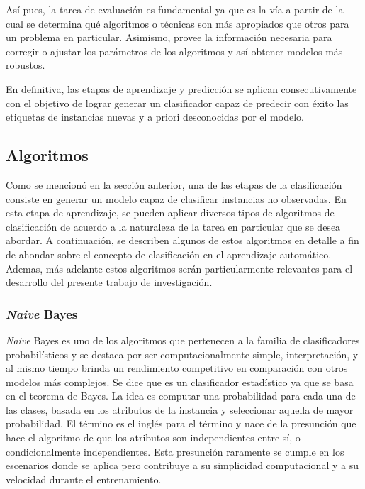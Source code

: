 Así pues, la tarea de evaluación es fundamental ya que es la vía a partir de la
cual se determina qué algoritmos o técnicas son más apropiados que otros para un
problema en particular. Asimismo, provee la información necesaria para corregir
o ajustar los parámetros de los algoritmos y así obtener modelos más robustos. 

En definitiva, las etapas de aprendizaje y predicción se aplican
consecutivamente con el objetivo de lograr generar un clasificador capaz de
predecir con éxito las etiquetas de instancias nuevas y a priori desconocidas
por el modelo.

\subsection{Algoritmos}
\label{clasificacion_algoritmos}

Como se mencionó en la sección anterior, una de las etapas de la clasificación
consiste en generar un modelo capaz de clasificar instancias no observadas. En
esta etapa de aprendizaje, se pueden aplicar diversos tipos de algoritmos de
clasificación de acuerdo a la naturaleza de la tarea en particular que se desea
abordar. A continuación, se describen algunos de estos algoritmos en detalle a
fin de ahondar sobre el concepto de clasificación en el aprendizaje automático.
Ademas, más adelante estos algoritmos serán particularmente relevantes para el
desarrollo del presente trabajo de investigación.

\subsubsection{\textit{Naive} Bayes}

\textit{Naive} Bayes es uno de los algoritmos que pertenecen a la familia de
clasificadores probabilísticos y se destaca por ser computacionalmente simple,
interpretación, y al mismo tiempo brinda un  rendimiento competitivo en
comparación con otros modelos más complejos. Se dice que es un clasificador
estadístico ya que se basa en el teorema de Bayes. La idea es computar una
probabilidad para cada una de las clases, basada en los atributos de la
instancia y seleccionar aquella de mayor probabilidad. El término
 es el inglés para el término
 y nace de la presunción que hace el algoritmo de que
los atributos son independientes entre sí, o condicionalmente independientes.
Esta presunción raramente se cumple en los escenarios donde se aplica pero
contribuye a su simplicidad computacional y a su velocidad durante el
entrenamiento.


